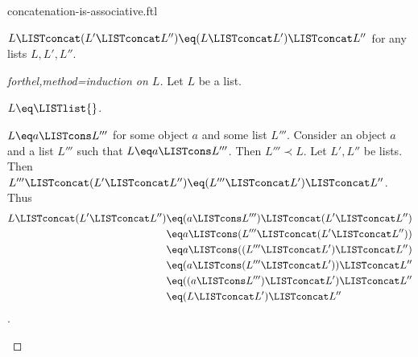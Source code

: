 \documentclass{naproche-library}
\begin{document}
\begin{smodule}[title=Concatenation is Associative]{concatenation-is-associative.ftl}

\begin{proposition}[forthel,id=ConcatIsAssociativeProp]
  $L \LISTconcat (L' \LISTconcat L'') \eq (L \LISTconcat L') \LISTconcat L''$ for any lists $L, L', L''$.
\end{proposition}
\begin{proof}[forthel,method=induction on $L$]
  Let $L$ be a list.

  \begin{case}{$L \eq \LISTlist{}$.} \end{case}

  \begin{case}{$L \eq a \LISTcons L'''$ for some object $a$ and some list $L'''$.}
    Consider an object $a$ and a list $L'''$ such that $L \eq a \LISTcons L'''$.
    Then $L''' \prec L$.
    Let $L',L''$ be lists.
    Then $L''' \LISTconcat (L' \LISTconcat L'') \eq (L''' \LISTconcat L') \LISTconcat L''$.
    Thus
    \begin{align*}
      L \LISTconcat (L' \LISTconcat L'') 
        &\eq (a \LISTcons L''') \LISTconcat (L' \LISTconcat L'')\\
        &\eq a \LISTcons (L''' \LISTconcat (L' \LISTconcat L''))\\
        &\eq a \LISTcons ((L''' \LISTconcat L') \LISTconcat L'')\\
        &\eq (a \LISTcons (L''' \LISTconcat L')) \LISTconcat L''\\
        &\eq ((a \LISTcons L''') \LISTconcat L') \LISTconcat L''\\
        &\eq (L \LISTconcat L') \LISTconcat L''
    \end{align*}.
  \end{case}
\end{proof}
\end{smodule}
\end{document}
